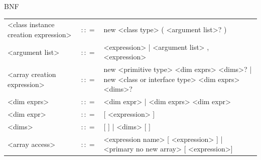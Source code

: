\documentclass[landscape, 11pt]{article}
\begin{document}
\begin{qsection}{BNF}
\begin{enumerate}[label=\bt{\theenumi.}]
\begin{longtable}{R{7cm} c L{15cm}}
				\\
				<class instance creation expression>		&	$\colon\colon=$	&	new <class type> ( <argument list>? )
				\\
				<argument list>								&	$\colon\colon=$	&	<expression> | <argument list> , <expression>
				\\
				<array creation expression>					&	$\colon\colon=$	&	new <primitive type> <dim exprs> <dims>? | new <class or interface type> <dim exprs> <dims>?
				\\
				<dim exprs>									&	$\colon\colon=$	&	<dim expr> | <dim exprs> <dim expr>
				\\
				<dim expr>									&	$\colon\colon=$	&	[ <expression> ]
				\\
				<dims>										&	$\colon\colon=$	&	[ ] | <dims> [ ]
				\\
				<array access>								&	$\colon\colon=$	&	<expression name> [ <expression> ] | <primary no new array> [ <expression>]
			\end{longtable}

		\ditem[Tokens.]


\end{enumerate}
\end{qsection}
\end{document}
